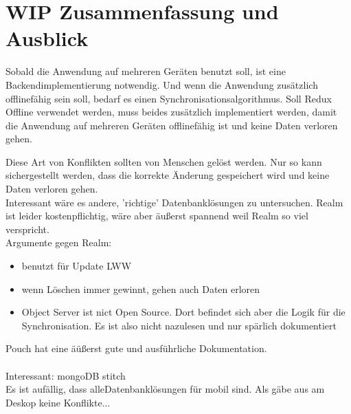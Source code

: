 \chapter{\label{chap:fazit}WIP Zusammenfassung und Ausblick}

Sobald die Anwendung auf mehreren Geräten benutzt soll, ist eine Backendimplementierung notwendig.
Und wenn die Anwendung zusätzlich offlinefähig sein soll, bedarf es einen Synchronisationsalgorithmus.
Soll Redux Offline verwendet werden, muss beides zusätzlich implementiert werden, damit die Anwendung auf mehreren Geräten offlinefähig ist und keine Daten verloren gehen.

Diese Art von Konflikten sollten von Menschen gelöst werden. Nur so kann sichergestellt werden, dass die korrekte Änderung gespeichert wird und keine Daten verloren gehen.\\

Interessant wäre es andere, 'richtige' Datenbanklösungen zu untersuchen. 
Realm ist leider kostenpflichtig, wäre aber äußerst spannend weil Realm so viel verspricht.\\
Argumente gegen Realm:
\begin{itemize}
  \item benutzt für Update LWW
  \item wenn Löschen immer gewinnt, gehen auch Daten erloren
  \item Object Server ist nict Open Source. Dort befindet sich aber die Logik für die Synchronisation. Es ist also nicht nazulesen und nur spärlich dokumentiert
\end{itemize}
Pouch hat eine äüßerst gute und ausführliche Dokumentation.\\\\
Interessant: mongoDB stitch \\
Es ist aufällig, dass alleDatenbanklösungen für mobil sind. Als gäbe aus am Deskop keine Konflikte...